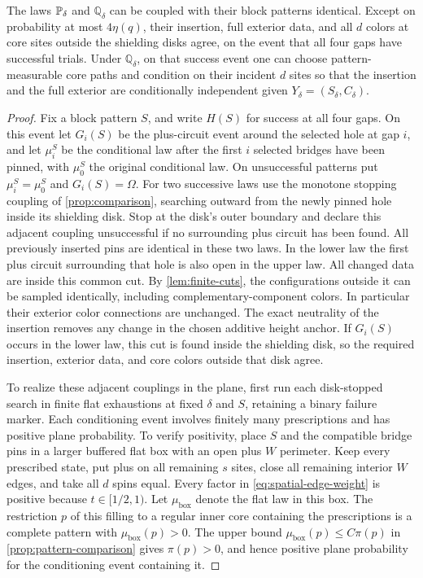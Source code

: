 \begin{lemma}
\label{lem:screen-bridge-coupling}
The laws $\P_\delta$ and $\mathbb Q_\delta$ can be coupled with their
block patterns identical. Except on probability at most $4\eta(q)$,
their insertion, full exterior data, and all $d$ colors at core sites
outside the shielding disks agree, on the event that all four gaps
have successful trials. Under $\mathbb Q_\delta$, on that success
event one can choose pattern-measurable core paths and condition on
their incident $d$ sites so that the insertion and the full exterior
are conditionally independent given $Y_\delta=(S_\delta,C_\delta)$.
\end{lemma}

\begin{proof}
Fix a block pattern $S$, and write $H(S)$ for success at all four gaps.
On this event let $G_i(S)$ be the plus-circuit event around the selected
hole at gap $i$, and let $\mu_i^S$ be the conditional law after the first
$i$ selected bridges have been pinned, with $\mu_0^S$ the original
conditional law. On unsuccessful patterns put $\mu_i^S=\mu_0^S$ and
$G_i(S)=\Omega$. For two successive laws use the monotone stopping
coupling of \cref{prop:comparison}, searching outward from the newly
pinned hole inside its shielding disk. Stop at the disk's outer boundary
and declare this adjacent coupling unsuccessful if no surrounding plus
circuit has been found. All previously inserted pins are identical in
these two laws.
In the lower law the first plus circuit surrounding that hole is also
open in the upper law. All changed data are inside this common cut. By
\cref{lem:finite-cuts}, the configurations outside it can be sampled
identically, including complementary-component colors. In particular
their exterior color connections are unchanged. The exact neutrality of
the insertion removes any change in the chosen additive height anchor.
If $G_i(S)$ occurs in the lower law, this cut is found inside the
shielding disk, so the required insertion, exterior data, and core colors
outside that disk agree.

To realize these adjacent couplings in the plane, first run each disk-stopped
search in finite flat exhaustions at fixed $\delta$ and $S$, retaining a
binary failure marker. Each conditioning event involves finitely many
prescriptions and has positive plane probability. To verify positivity,
place $S$ and the compatible bridge pins in a larger buffered flat box
with an open plus $W$ perimeter. Keep every prescribed state, put plus
on all remaining $s$ sites, close all remaining interior $W$ edges, and
take all $d$ spins equal. Every factor in \cref{eq:spatial-edge-weight}
is positive because $t\in[1/2,1)$. Let $\mu_{\mathrm{box}}$ denote the
flat law in this box. The restriction $p$ of this filling to a regular
inner core containing the prescriptions is a complete pattern with
$\mu_{\mathrm{box}}(p)>0$. The upper bound
$\mu_{\mathrm{box}}(p)\le C\pi(p)$ in \cref{prop:pattern-comparison}
gives $\pi(p)>0$, and hence positive plane probability for the conditioning
event containing it.


\end{proof}
